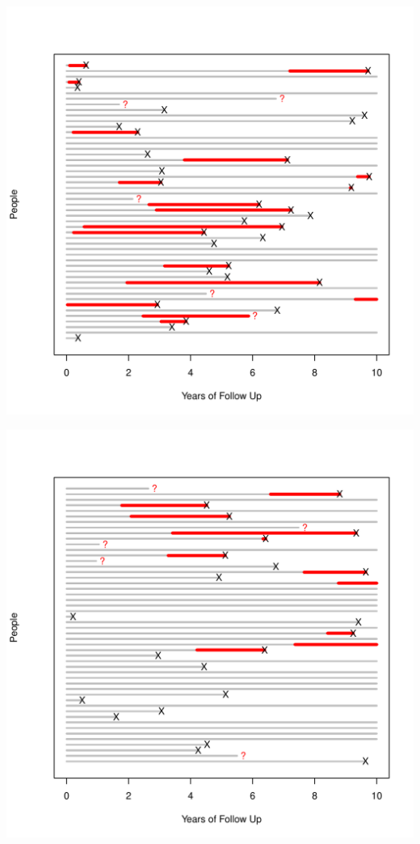 \documentclass{article}\usepackage{graphicx, color}
\newenvironment{knitrout}{}{} %
\begin{document}
\begin{knitrout}
\color{fgcolor}\includegraphics[width=6in]{figure/six} 
\end{knitrout}


\begin{knitrout}
\color{fgcolor}\includegraphics[width=6in]{figure/seven} 
\end{knitrout}
\end{document}
